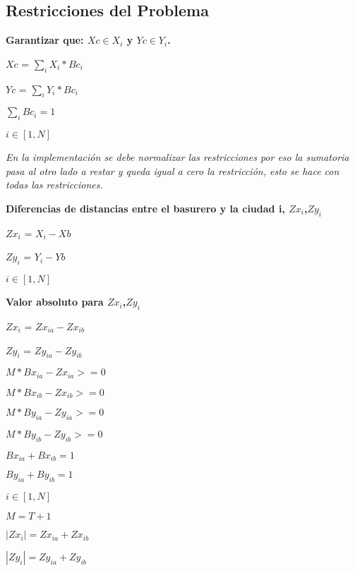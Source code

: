 \documentclass[10pt]{article}
\begin{document}
\subsection{Restricciones del Problema}
\textbf{Garantizar que:  $Xc \in X_i$ y $Yc \in Y_i$. }\\

\begin{center}
$Xc$ = $\sum_i X_i * Bc_i$

$Yc$ = $\sum_i Y_i * Bc_i$

$\sum_i Bc_i = 1$

$i \in [1,N]$

 \emph{En la implementación se debe normalizar las restricciones por eso la sumatoria pasa al otro lado a restar y queda igual a cero la restricci\'on, esto se hace con todas las restricciones.}

\end{center}



\textbf{Diferencias de distancias entre el basurero y la ciudad i, $Zx_i$,$Zy_i$ }\\

\begin{center}

 $Zx_i$ = $X_i- Xb $ 
 
  $Zy_i$ = $Y_i-Yb$ 
  
  $i \in [1,N]$
\end{center}

\textbf{Valor absoluto para  $Zx_i$,$Zy_i$ }\\

\begin{center}

 $Zx_i$ = $Zx_{ia}  - Zx_{ib}$ 
 
  $Zy_i$ = $Zy_{ia}  - Zy_{ib}$ \medskip 
  
  $M*Bx_{ia} - Zx_{ia} >= 0$
  
  $M*Bx_{ib} - Zx_{ib} >= 0$\medskip 
  
    $M*By_{ia} - Zy_{ia} >= 0$
  
  $M*By_{ib} - Zy_{ib} >= 0$\medskip 
 
  
  
  
  $ Bx_{ia} + Bx_{ib} = 1 $
  
  $ By_{ia} + By_{ib} = 1 $\medskip 
  
   $i \in [1,N]$
   
   $M=T+1$\bigskip
  
   $ |Zx_i|=Zx_{ia}  + Zx_{ib} $ 
   
   $ |Zy_i|=Zy_{ia}  +  Zy_{ib} $ 
\end{center}
\end{document}
